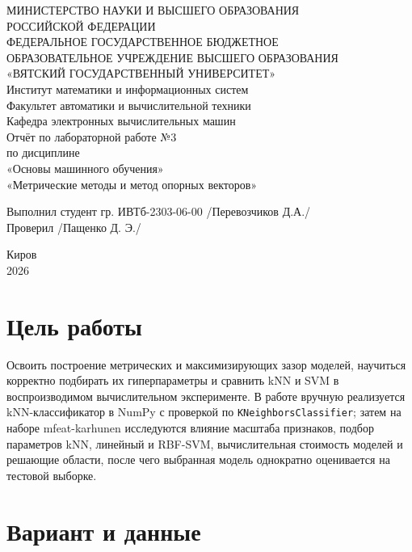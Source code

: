 \documentclass[14pt,a4paper]{extarticle}
\begin{document}
\begin{titlepage}
\thispagestyle{empty}
\centering
МИНИСТЕРСТВО НАУКИ И ВЫСШЕГО ОБРАЗОВАНИЯ\\
РОССИЙСКОЙ ФЕДЕРАЦИИ\\[2pt]
ФЕДЕРАЛЬНОЕ ГОСУДАРСТВЕННОЕ БЮДЖЕТНОЕ\\
ОБРАЗОВАТЕЛЬНОЕ УЧРЕЖДЕНИЕ ВЫСШЕГО ОБРАЗОВАНИЯ\\
«ВЯТСКИЙ ГОСУДАРСТВЕННЫЙ УНИВЕРСИТЕТ»\\[2pt]
Институт математики и информационных систем\\
Факультет автоматики и вычислительной техники\\
Кафедра электронных вычислительных машин\\[3.5cm]
{\Large Отчёт по лабораторной работе №3}\\[4pt]
по дисциплине\\[4pt]
«Основы машинного обучения»\\[4pt]
«Метрические методы и метод опорных векторов»\\[3.5cm]
\begin{flushleft}
Выполнил студент гр. ИВТб-2303-06-00 \hfill /Перевозчиков Д.А./\\[1.2cm]
Проверил \hfill /Пащенко Д. Э./
\end{flushleft}
\vfill
Киров\\
2026
\end{titlepage}

\section{Цель работы}

Освоить построение метрических и максимизирующих зазор моделей, научиться корректно подбирать их гиперпараметры и сравнить kNN и SVM в воспроизводимом вычислительном эксперименте. В работе вручную реализуется kNN-классификатор в NumPy с проверкой по \texttt{KNeighborsClassifier}; затем на наборе mfeat-karhunen исследуются влияние масштаба признаков, подбор параметров kNN, линейный и RBF-SVM, вычислительная стоимость моделей и решающие области, после чего выбранная модель однократно оценивается на тестовой выборке.

\section{Вариант и данные}
\end{document}
